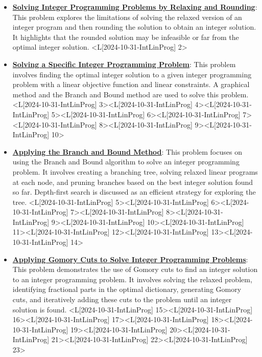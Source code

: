 \documentclass{article}%
\begin{document}
\begin{itemize}[[leftmargin=*]]%
\item \href{https://www.math.purdue.edu/~yipn/421/2024-10-31-IntLinProg.pdf#page=2}{\textbf{Solving Integer Programming Problems by Relaxing and Rounding}}: This problem explores the limitations of solving the relaxed version of an integer program and then rounding the solution to obtain an integer solution. It highlights that the rounded solution may be infeasible or far from the optimal integer solution. <L[2024-10-31-IntLinProg] 2>%
\item \href{https://www.math.purdue.edu/~yipn/421/2024-10-31-IntLinProg.pdf#page=3}{\textbf{Solving a Specific Integer Programming Problem}}: This problem involves finding the optimal integer solution to a given integer programming problem with a linear objective function and linear constraints. A graphical method and the Branch and Bound method are used to solve this problem. <L[2024-10-31-IntLinProg] 3><L[2024-10-31-IntLinProg] 4><L[2024-10-31-IntLinProg] 5><L[2024-10-31-IntLinProg] 6><L[2024-10-31-IntLinProg] 7><L[2024-10-31-IntLinProg] 8><L[2024-10-31-IntLinProg] 9><L[2024-10-31-IntLinProg] 10>%
\item \href{https://www.math.purdue.edu/~yipn/421/2024-10-31-IntLinProg.pdf#page=5}{\textbf{Applying the Branch and Bound Method}}: This problem focuses on using the Branch and Bound algorithm to solve an integer programming problem. It involves creating a branching tree, solving relaxed linear programs at each node, and pruning branches based on the best integer solution found so far. Depth-first search is discussed as an efficient strategy for exploring the tree. <L[2024-10-31-IntLinProg] 5><L[2024-10-31-IntLinProg] 6><L[2024-10-31-IntLinProg] 7><L[2024-10-31-IntLinProg] 8><L[2024-10-31-IntLinProg] 9><L[2024-10-31-IntLinProg] 10><L[2024-10-31-IntLinProg] 11><L[2024-10-31-IntLinProg] 12><L[2024-10-31-IntLinProg] 13><L[2024-10-31-IntLinProg] 14>%
\item \href{https://www.math.purdue.edu/~yipn/421/2024-10-31-IntLinProg.pdf#page=15}{\textbf{Applying Gomory Cuts to Solve Integer Programming Problems}}: This problem demonstrates the use of Gomory cuts to find an integer solution to an integer programming problem. It involves solving the relaxed problem, identifying fractional parts in the optimal dictionary, generating Gomory cuts, and iteratively adding these cuts to the problem until an integer solution is found. <L[2024-10-31-IntLinProg] 15><L[2024-10-31-IntLinProg] 16><L[2024-10-31-IntLinProg] 17><L[2024-10-31-IntLinProg] 18><L[2024-10-31-IntLinProg] 19><L[2024-10-31-IntLinProg] 20><L[2024-10-31-IntLinProg] 21><L[2024-10-31-IntLinProg] 22><L[2024-10-31-IntLinProg] 23>%
\end{itemize}%
\end{document}
